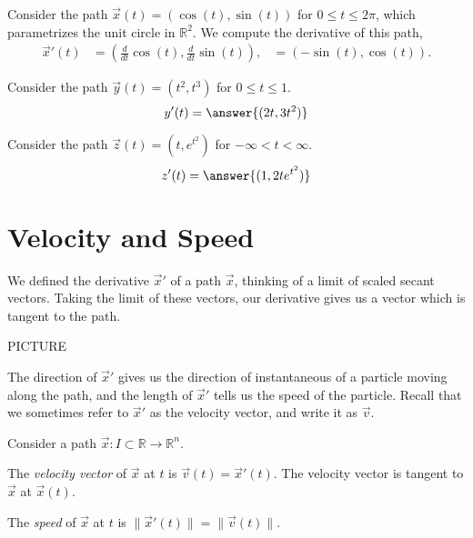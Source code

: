 \documentclass{ximera}
\begin{document}
\begin{example}
Consider the path $\vec{x}(t) = (\cos(t), \sin(t))$ for $0\leq t\leq 2\pi$, which parametrizes the unit circle in $\mathbb{R}^2$. We compute the derivative of this path,
\begin{align*}
\vec{x}'(t) &= \left(\frac{d}{dt}\cos(t), \frac{d}{dt}\sin(t)\right),
&= \left(-\sin(t), \cos(t)\right).
\end{align*}

Consider the path $\vec{y}(t) = (t^2,t^3)$ for $0\leq t\leq 1$.
\[
y'(t) = \answer{(2t, 3t^2)}
\]

Consider the path $\vec{z}(t) = \left(t, e^{t^2}\right)$ for $-\infty < t < \infty$.
\[
z'(t) = \answer{(1, 2te^{t^2})}
\]
\end{example}

\section{Velocity and Speed}

We defined the derivative $\vec{x}'$ of a path $\vec{x}$, thinking of a limit of scaled secant vectors. Taking the limit of these vectors, our derivative gives us a vector which is tangent to the path.

PICTURE

The direction of $\vec{x}'$ gives us the direction of instantaneous of a particle moving along the path, and the length of $\vec{x}'$ tells us the speed of the particle. Recall that we sometimes refer to $\vec{x}'$ as the velocity vector, and write it as $\vec{v}$.

\begin{definition}
Consider a path $\vec{x}:I\subset\mathbb{R}\rightarrow\mathbb{R}^n$.

The \emph{velocity vector} of $\vec{x}$ at $t$ is $\vec{v}(t) = \vec{x}'(t)$. The velocity vector is tangent to $\vec{x}$ at $\vec{x}(t)$.

The \emph{speed} of $\vec{x}$ at $t$ is $\|\vec{x}'(t)\| = \|\vec{v}(t)\|$.
\end{definition}
\end{document}

